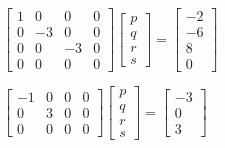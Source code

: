 \begin{exercise}
\begin{Parts}
\item \(\begin{bmatrix} 1&0&0&0
\\0&-3&0&0
\\0&0&-3&0
\\0&0&0&0 \end{bmatrix}
\begin{bmatrix}p\\q\\r\\s\end{bmatrix}
=\begin{bmatrix} -2
\\-6
\\8
\\0 \end{bmatrix}\)

\item \(\begin{bmatrix} -1&0&0&0
\\0&3&0&0
\\0&0&0&0 \end{bmatrix}
\begin{bmatrix}p\\q\\r\\s\end{bmatrix}
=\begin{bmatrix} -3
\\0
\\3 \end{bmatrix}\)

\end{Parts}
\end{exercise}





